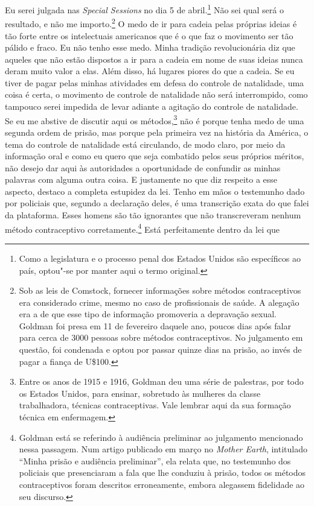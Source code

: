 Eu serei julgada nas \emph{Special Sessions} no dia 5 de
abril.\footnote{Como a legislatura e o processo penal dos Estados Unidos
  são específicos ao país, optou"-se por manter aqui o termo original.}
Não sei qual será o resultado, e não me importo.\footnote{Sob as leis de
  Comstock, fornecer informações sobre métodos contraceptivos era
  considerado crime, mesmo no caso de profissionais de saúde. A alegação
  era a de que esse tipo de informação promoveria a depravação sexual.
  Goldman foi presa em 11 de fevereiro daquele ano, poucos dias após
  falar para cerca de 3000 pessoas sobre métodos contraceptivos. No
  julgamento em questão, foi condenada e optou por passar quinze dias na
  prisão, ao invés de pagar a fiança de U\$100.} O medo de ir para\label{ref5}
cadeia pelas próprias ideias é tão forte entre os intelectuais
americanos que é o que faz o movimento ser tão pálido e fraco. Eu não
tenho esse medo. Minha tradição revolucionária diz que aqueles que não
estão dispostos a ir para a cadeia em nome de suas ideias nunca deram
muito valor a elas. Além disso, há lugares piores do que a cadeia. Se eu
tiver de pagar pelas minhas atividades em defesa do controle de
natalidade, uma coisa é certa, o movimento de controle de natalidade não
será interrompido, como tampouco serei impedida de levar adiante a
agitação do controle de natalidade. Se eu me abstive de discutir aqui os
métodos,\footnote{Entre os anos de 1915 e 1916, Goldman deu uma série de
  palestras, por todo os Estados Unidos, para ensinar, sobretudo às
  mulheres da classe trabalhadora, técnicas contraceptivas. Vale lembrar
  aqui da sua formação técnica em enfermagem.} não é porque tenha medo
de uma segunda ordem de prisão, mas porque pela primeira vez na história
da América, o tema do controle de natalidade está circulando, de modo
claro, por meio da informação oral e como eu quero que seja combatido
pelos seus próprios méritos, não desejo dar aqui às autoridades a
oportunidade de confundir as minhas palavras com alguma outra coisa.
E justamente no que diz respeito a esse aspecto, destaco
a completa estupidez da lei. Tenho em
mãos o testemunho dado por policiais que, segundo a declaração deles, é
uma transcrição exata do que falei da plataforma. Esses homens são tão
ignorantes que não transcreveram nenhum método contraceptivo
corretamente.\footnote{Goldman está se referindo à audiência
  preliminar ao julgamento mencionado nessa passagem.
  Num artigo publicado em março no
  \emph{Mother Earth}, intitulado ``Minha prisão e audiência
  preliminar'', ela relata que, no testemunho dos policiais que
  presenciaram a fala que lhe conduziu à prisão, todos os métodos
  contraceptivos foram descritos erroneamente, embora alegassem
  fidelidade ao seu discurso.} Está perfeitamente dentro da lei que
